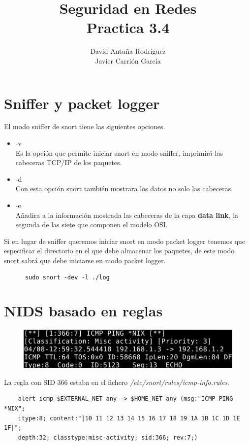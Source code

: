 \documentclass[11pt]{article}
\title{\Large Seguridad en Redes\\Practica 3.4}
\author{David Antuña Rodríguez\\Javier Carrión García}
\date{}
\begin{document}
  \raggedright

  \maketitle
  \newpage

  \section{Sniffer y packet logger}
    \par
    El modo sniffer de snort tiene las siguientes opciones.
    \begin{itemize}
      \item -v\\
        Es la opción que permite iniciar snort en modo sniffer, imprimirá las
        cabeceras TCP/IP de los paquetes.
      \item -d\\
        Con esta opción snort también mostrara los datos no solo las cabeceras.
      \item -e\\
        Añadira a la información mostrada las cabeceras de la capa
        \textbf{data link}, la segunda de las siete que componen el modelo OSI.
    \end{itemize}

    \bigskip
    \par
    Si en lugar de sniffer queremos iniciar snort en modo packet logger tenemos
    que especificar el directorio en el que debe almacenar los paquetes, de este
    modo snort sabrá que debe iniciarse en modo packet logger.

    \begin{lstlisting}
      sudo snort -dev -l ./log
    \end{lstlisting}

  \section{NIDS basado en reglas}
    \begin{figure}[H]
      \centering
      \includegraphics[width = \textwidth]{nbra}
    \end{figure}
    \par
    La regla con SID 366 estaba en el fichero
    \textit{/etc/snort/rules/icmp-info.rules}.
    \begin{lstlisting}
    alert icmp $EXTERNAL_NET any -> $HOME_NET any (msg:"ICMP PING *NIX";
    itype:8; content:"|10 11 12 13 14 15 16 17 18 19 1A 1B 1C 1D 1E 1F|";
    depth:32; classtype:misc-activity; sid:366; rev:7;)
    \end{lstlisting}
\end{document}
